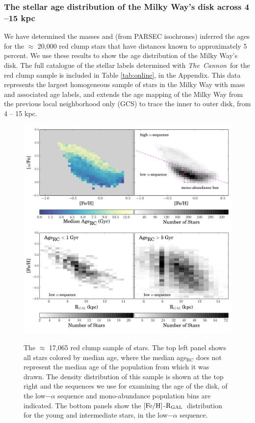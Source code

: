 \documentclass[12pt, preprint]{aastex}
\newcommand{\project}[1]{\textsl{#1}}
\newcommand{\tc}{\project{The~Cannon}}
\newcommand{\feh}{\mbox{$\rm [Fe/H]$}}
\newcommand{\rgal}{\mbox{$\rm R_{GAL}$}}
\begin{document}
\subsubsection{The stellar age distribution of the Milky Way's disk across 4 --15 kpc}

We have determined the masses and (from PARSEC isochrones) inferred the ages for the $\approx$ 20,000 red clump stars that have distances known to approximately 5 percent. We use these results to show the age distribution of the Milky Way's disk. The full catalogue of the stellar labels determined with \tc\ for the red clump sample is included in Table \ref{tab:online}, in the Appendix. This data represents the largest homogeneous sample of stars in the Milky Way with mass and associated age labels, and extends the age mapping of the Milky Way from the previous local neighborhood only (GCS) to trace the inner to outer disk, from 4 -- 15 kpc.  

\begin{figure}[p]
\centering
 \includegraphics[scale=0.5]{./plots/redclump_4panel.pdf}\\
    \caption{The $\approx$ 17,065 red clump sample of stars. The top left panel shows all stars colored by median age, where the median age$_{\mbox{RC}}$ does not represent the median age of the population from which it was drawn. The density distribution of this sample is shown at the top right and the sequences we use for examining the age of the disk, of the low$-\alpha$ sequence and mono-abundance population bins are indicated. The bottom panels show the \feh-\rgal\ distribution for the young and intermediate stars, in the low$-\alpha$ sequence.}
\label{fig:redclump}
\end{figure}
\end{document}
